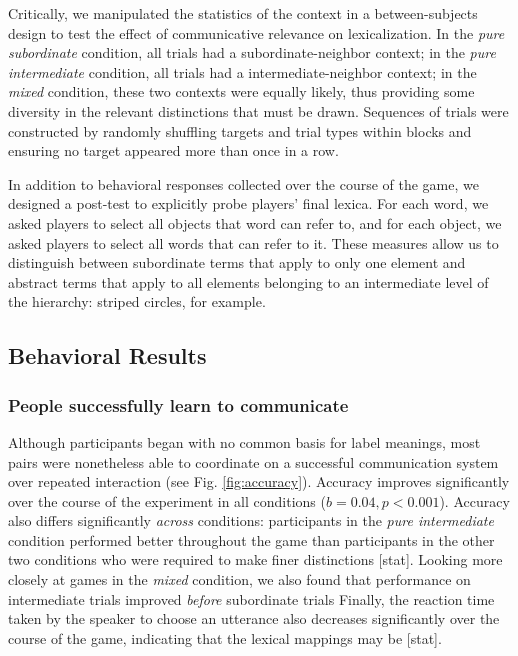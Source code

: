 \documentclass[10pt,letterpaper]{article}
\begin{document}
Critically, we manipulated the statistics of the context in a between-subjects design to test the effect of communicative relevance on lexicalization. In the \emph{pure subordinate} condition, all trials had a subordinate-neighbor context; in the \emph{pure intermediate} condition, all trials had a intermediate-neighbor context; in the \emph{mixed} condition, these two contexts were equally likely, thus providing some diversity in the relevant distinctions that must be drawn. Sequences of trials were constructed by randomly shuffling targets and trial types within blocks and ensuring no target appeared more than once in a row.

In addition to behavioral responses collected over the course of the game, we designed a post-test to explicitly probe players' final lexica. For each word, we asked players to select all objects that word can refer to, and for each object, we asked players to select all words that can refer to it. These measures allow us to distinguish between subordinate terms that apply to only one element and abstract terms that apply to all elements belonging to an intermediate level of the hierarchy: striped circles, for example.

\subsection{Behavioral Results}

\subsubsection{People successfully learn to communicate}

Although participants began with no common basis for label meanings, most pairs were nonetheless able to coordinate on a successful communication system over repeated interaction (see Fig. \ref{fig:accuracy}). Accuracy improves significantly over the course of the experiment in all conditions ($b = 0.04, p < 0.001$). Accuracy also differs significantly \emph{across} conditions: participants in the \emph{pure intermediate} condition performed better throughout the game than participants in the other two conditions who were required to make finer distinctions [stat]. Looking more closely at games in the \emph{mixed} condition, we also found that performance on intermediate trials improved \emph{before} subordinate trials  Finally, the reaction time taken by the speaker to choose an utterance also decreases significantly over the course of the game, indicating that the lexical mappings may be  [stat]. 
\end{document}
